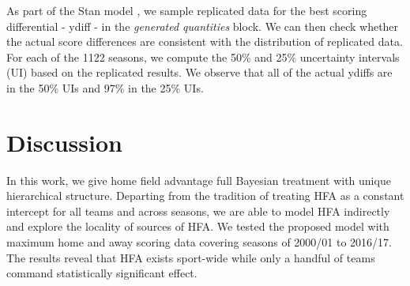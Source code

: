 \documentclass[]{interact}
\theoremstyle{plain}%
\theoremstyle{definition}
\theoremstyle{remark}
\begin{document}
As part of the Stan model \citep{team2015stan}, we sample replicated data for the best scoring differential - ydiff - in the \textit{generated quantities} block. We can then check whether the actual score differences are consistent with the distribution of replicated data. For each of the 1122 seasons, we compute the 50\% and 25\% uncertainty intervals (UI) based on the replicated results. We observe that all of the actual ydiffs are in the 50\% UIs and 97\% in the 25\% UIs.   

\section{Discussion}

In this work, we give home field advantage full Bayesian treatment with unique hierarchical structure. Departing from the tradition of treating HFA as a constant intercept for all teams and across seasons, we are able to model HFA indirectly and explore the locality of sources of HFA. We tested the proposed model with maximum home and away scoring data covering seasons of 2000/01 to 2016/17. The results reveal that HFA exists sport-wide while only a handful of teams command statistically significant effect. 




\end{document}
